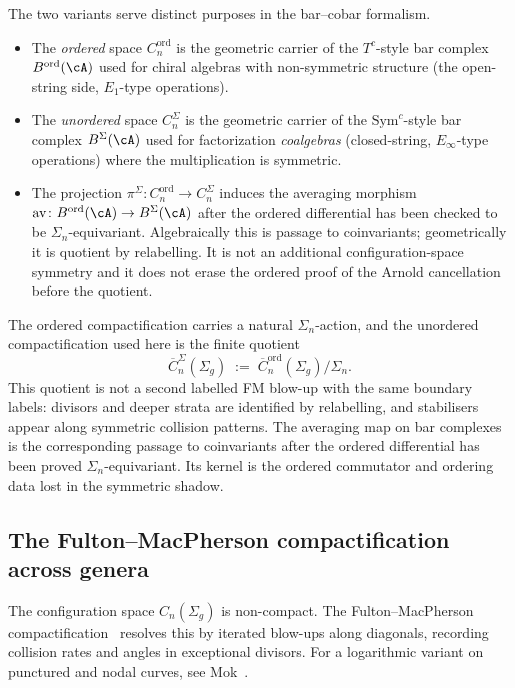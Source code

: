 \begin{remark}
\label{rem:ordered-vs-unordered-config}
The two variants serve distinct purposes in the bar--cobar formalism.
\begin{itemize}
\item The \emph{ordered} space $C^{\mathrm{ord}}_n$ is the geometric carrier
 of the $T^c$-style bar complex
 $B^{\mathrm{ord}}(\cA)$ used for chiral algebras with non-symmetric
 structure (the open-string side, $E_1$-type operations).
\item The \emph{unordered} space $C^{\Sigma}_n$ is the geometric carrier
 of the $\mathrm{Sym}^c$-style bar complex $B^{\Sigma}(\cA)$ used for
 factorization \emph{coalgebras} (closed-string, $E_\infty$-type
 operations) where the multiplication is symmetric.
\item The projection $\pi^\Sigma\colon C^{\mathrm{ord}}_n \to C^{\Sigma}_n$
 induces the averaging morphism
 $\mathrm{av}\colon B^{\mathrm{ord}}(\cA) \to B^{\Sigma}(\cA)$
 after the ordered differential has been checked to be
 $\Sigma_n$-equivariant. Algebraically this is passage to
 coinvariants; geometrically it is quotient by relabelling. It is not
 an additional configuration-space symmetry and it does not erase the
 ordered proof of the Arnold cancellation before the quotient.
\end{itemize}
The ordered compactification carries a natural $\Sigma_n$-action, and
the unordered compactification used here is the finite quotient
\[
\overline C^\Sigma_n(\Sigma_g)
\;:=\;
\overline C^{\mathrm{ord}}_n(\Sigma_g)/\Sigma_n .
\]
This quotient is not a second labelled FM blow-up with the same boundary
labels: divisors and deeper strata are identified by relabelling, and
stabilisers appear along symmetric collision patterns. The averaging map
on bar complexes is the corresponding passage to coinvariants after the
ordered differential has been proved $\Sigma_n$-equivariant. Its kernel
is the ordered commutator and ordering data lost in the symmetric shadow.
\end{remark}

\subsection{The Fulton--MacPherson compactification across genera}

The configuration space $C_n(\Sigma_g)$ is non-compact. The Fulton--MacPherson compactification~\cite{FM94} resolves this by iterated blow-ups along diagonals, recording collision rates and angles in exceptional divisors. For a logarithmic variant on punctured and nodal curves, see Mok~\cite{Mok25}.

